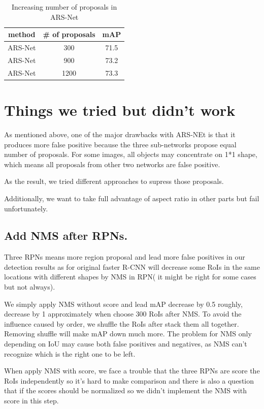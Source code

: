 \documentclass[10pt,twocolumn,letterpaper]{article}
\begin{document}
\begin{table}[ht]
\centering
\begin{tabular}{|c|c|c|}
\hline 
 method & \# of proposals & mAP
\\ \hline 
 ARS-Net & 300 & 71.5
\\ \hline 
 ARS-Net & 900 & 73.2
\\ \hline 
 ARS-Net & 1200 & 73.3
\\ \hline
\end{tabular}
\caption{Increasing number of proposals in ARS-Net}
\label{Exp2}
\end{table}


\section{Things we tried but didn't work}
\par
As mentioned above, one of the major drawbacks with ARS-NEt is that it produces more false positive because the three sub-networks propose equal number of proposals. For some images, all objects may concentrate on 1*1 shape, which means all proposals from other two networks are false positive.
\par
As the result, we tried different approaches to supress those proposals.
\par 
Additionally, we want to take full advantage of aspect ratio in other parts but fail unfortunately.
\subsection{Add NMS after RPNs.}
\par
Three RPNs means more region proposal and lead more false positives in our detection results as for original faster R-CNN will decrease some RoIs in the same locations with different shapes by NMS in RPN( it might be right for some cases but not always).

\par
We simply apply NMS without score and lead mAP decrease by 0.5 roughly, decrease by 1 approximately when choose 300 RoIs after NMS. To avoid the influence caused by order, we shuffle the RoIs after stack them all together. Removing shuffle will make mAP down much more. The problem for NMS only depending on IoU may cause both false positives and negatives, as NMS can't recognize which is the right one to be left.

\par
When apply NMS with score, we face a trouble that the three RPNs are score the RoIs independently so it’s hard to make comparison and there is also a question that if the scores should be normalized so we didn’t implement the NMS with score in this step.
\end{document}
